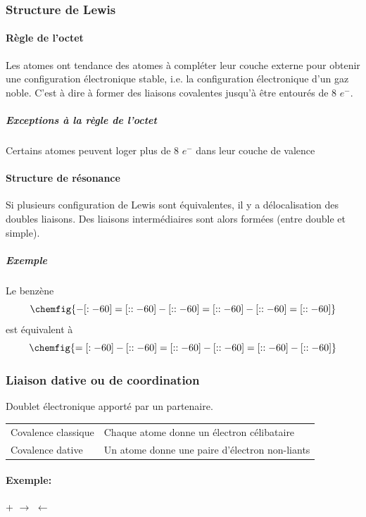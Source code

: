 \documentclass[11pt,a4paper,french]{article}
\begin{document}
\subsubsection{Structure de Lewis}
\paragraph{Règle de l'octet}
Les atomes ont tendance des atomes à compléter leur couche externe pour obtenir une configuration électronique stable, i.e. la configuration électronique d'un gaz noble.
C'est à dire à former des liaisons covalentes jusqu'à être entourés de 8 $e^-$.
\subparagraph{Exceptions à la règle de l'octet}
Certains atomes peuvent loger plus de 8 $e^-$ dans leur couche de valence

\paragraph{Structure de résonance}
Si plusieurs configuration de Lewis sont équivalentes, il y a délocalisation des doubles liaisons.
Des liaisons intermédiaires sont alors formées (entre double et simple).
\subparagraph{Exemple} Le benzène
$$\chemfig{-[:-60]=[::-60]-[::-60]=[::-60]-[::-60]=[::-60]}$$ est équivalent à $$\chemfig{=[:-60]-[::-60]=[::-60]-[::-60]=[::-60]-[::-60]}$$

\subsubsection{Liaison dative ou de coordination}
Doublet électronique apporté par un partenaire.

\begin{center}
	\begin{tabular}{ll}
		Covalence classique & Chaque atome donne un électron célibataire\\
		Covalence dative & Un atome donne une paire d'électron non-liants
	\end{tabular}
\end{center}

\paragraph{Exemple:}
\begin{center}
	\hspace{0.3cm} + \hspace{0.3cm}$\longrightarrow$ $\leftarrow$
\end{center}
\end{document}
